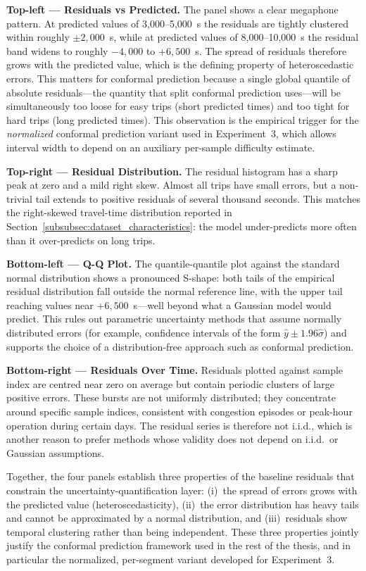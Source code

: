 \textbf{Top-left --- Residuals vs Predicted.} The panel shows a clear megaphone pattern. At predicted values of 3,000--5,000~s the residuals are tightly clustered within roughly $\pm 2,000$~s, while at predicted values of 8,000--10,000~s the residual band widens to roughly $-4,000$ to $+6,500$~s. The spread of residuals therefore grows with the predicted value, which is the defining property of heteroscedastic errors. This matters for conformal prediction because a single global quantile of absolute residuals---the quantity that split conformal prediction uses---will be simultaneously too loose for easy trips (short predicted times) and too tight for hard trips (long predicted times). This observation is the empirical trigger for the \emph{normalized} conformal prediction variant used in Experiment~3, which allows interval width to depend on an auxiliary per-sample difficulty estimate.

\textbf{Top-right --- Residual Distribution.} The residual histogram has a sharp peak at zero and a mild right skew. Almost all trips have small errors, but a non-trivial tail extends to positive residuals of several thousand seconds. This matches the right-skewed travel-time distribution reported in Section~\ref{subsubsec:dataset_characteristics}: the model under-predicts more often than it over-predicts on long trips.

\textbf{Bottom-left --- Q-Q Plot.} The quantile-quantile plot against the standard normal distribution shows a pronounced S-shape: both tails of the empirical residual distribution fall outside the normal reference line, with the upper tail reaching values near $+6,500$~s---well beyond what a Gaussian model would predict. This rules out parametric uncertainty methods that assume normally distributed errors (for example, confidence intervals of the form $\hat{y} \pm 1.96 \hat{\sigma}$) and supports the choice of a distribution-free approach such as conformal prediction.

\textbf{Bottom-right --- Residuals Over Time.} Residuals plotted against sample index are centred near zero on average but contain periodic clusters of large positive errors. These bursts are not uniformly distributed; they concentrate around specific sample indices, consistent with congestion episodes or peak-hour operation during certain days. The residual series is therefore not i.i.d., which is another reason to prefer methods whose validity does not depend on i.i.d.\ or Gaussian assumptions.

Together, the four panels establish three properties of the baseline residuals that constrain the uncertainty-quantification layer: (i)~the spread of errors grows with the predicted value (heteroscedasticity), (ii)~the error distribution has heavy tails and cannot be approximated by a normal distribution, and (iii)~residuals show temporal clustering rather than being independent. These three properties jointly justify the conformal prediction framework used in the rest of the thesis, and in particular the normalized, per-segment variant developed for Experiment~3.


